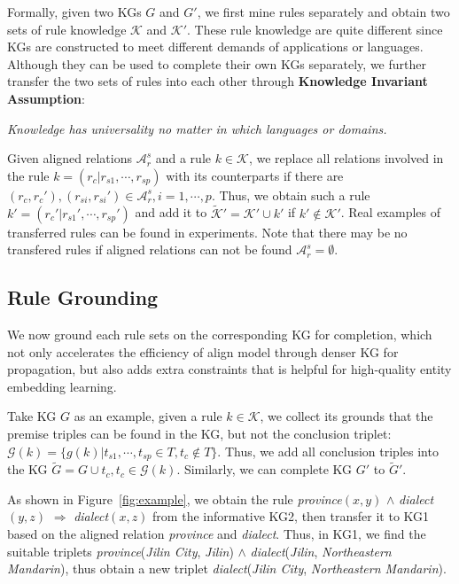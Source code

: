\documentclass[11pt,a4paper]{article}
\begin{document}
Formally, given two KGs $G$ and $G'$, we first mine rules separately and obtain two sets of rule knowledge $\mathcal{K}$ and $\mathcal{K}'$. These rule knowledge are quite different since KGs are constructed to meet different demands of applications or languages. Although they can be used to complete their own KGs separately, we further transfer the two sets of rules into each other through \textbf{Knowledge Invariant Assumption}:

\textit{Knowledge has universality no matter in which languages or domains.}

Given aligned relations $\mathcal{A}_r^s$ and a rule $k\in\mathcal{K}$, we replace all relations involved in the rule $k=(r_c|r_{s1},\cdots,r_{sp})$ with its counterparts if there are $(r_c,r_c'),(r_{si},r_{si}')\in \mathcal{A}_r^s,i=1,\cdots,p$. Thus, we obtain such a rule $k'=(r_c'|r_{s1}',\cdots,r_{sp}')$ and add it to $\tilde{\mathcal{K}}'=\mathcal{K}'\cup k'$ if $k'\notin \mathcal{K}'$. Real examples of transferred rules can be found in experiments. Note that there may be no transfered rules if aligned relations can not be found $\mathcal{A}_r^s=\emptyset$.

\subsection{Rule Grounding}
We now ground each rule sets on the corresponding KG for completion, which not only accelerates the efficiency of align model through denser KG for propagation, but also adds extra constraints that is helpful for high-quality entity embedding learning.

Take KG $G$ as an example, given a rule $k\in\mathcal{K}$, we collect its grounds that the premise triples can be found in the KG, but not the conclusion triplet: $\mathcal{G}(k)=\{g(k)|t_{s1},\cdots,t_{sp}\in T,t_c\notin T\}$. Thus, we add all conclusion triples into the KG $\tilde{G}=G\cup t_c, t_c\in\mathcal{G}(k)$. Similarly, we can complete KG $G'$ to $\tilde{G}'$.

As shown in Figure~\ref{fig:example}, we obtain the rule \textit{province}$(x,y)$ $\wedge$ \textit{dialect}$(y,z)$ $\Rightarrow$ \textit{dialect}$(x,z)$ from the informative KG2, then transfer it to KG1 based on the aligned relation \textit{province} and \textit{dialect}. Thus, in KG1, we find the suitable triplets \textit{province}(\textit{Jilin City}, \textit{Jilin}) $\wedge$ \textit{dialect}(\textit{Jilin}, \textit{Northeastern Mandarin}), thus obtain a new triplet \textit{dialect}(\textit{Jilin City}, \textit{Northeastern Mandarin}).
\end{document}
